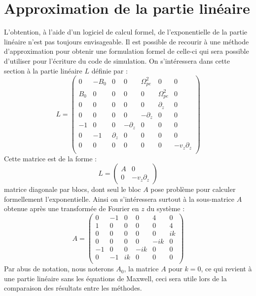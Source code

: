 
\section{Approximation de la partie linéaire}
\label{s3:approx}

L'obtention, à l'aide d'un logiciel de calcul formel, de l'exponentielle de la partie linéaire n'est pas toujours envisageable. Il est possible de recourir à une méthode d'approximation pour obtenir une formulation formel de celle-ci qui sera possible d'utiliser pour l'écriture du code de simulation. On s'intéressera dans cette section à la partie linéaire $L$ définie par :
$$
  L = \begin{pmatrix}
    0   & -B_0 & 0          &  0          &  \Omega_{pe}^2 & 0             & 0 \\
    B_0 &  0   & 0          &  0          &  0             & \Omega_{pe}^2 & 0 \\
    0   &  0   & 0          &  0          &  0             & \partial_z    & 0 \\
    0   &  0   & 0          &  0          & -\partial_z    & 0             & 0 \\
   -1   &  0   & 0          & -\partial_z &  0             & 0             & 0 \\
    0   & -1   & \partial_z &  0          &  0             & 0             & 0 \\
    0   &  0   & 0          &  0          &  0             & 0             & -v_z\partial_z \\
  \end{pmatrix}
$$
Cette matrice est de la forme :
$$
  L = \begin{pmatrix}
    A & 0 \\
    0 & -v_z\partial_z
  \end{pmatrix}
$$
matrice diagonale par blocs, dont seul le bloc $A$ pose problème pour calculer formellement l'exponentielle. Ainsi on s'intéressera surtout à la sous-matrice $A$ obtenue après une transformée de Fourier en $z$ du système :
$$
  A = \begin{pmatrix}
    0 & -1 & 0  &  0  &  4  & 0  \\
    1 &  0 & 0  &  0  &  0  & 4  \\
    0 &  0 & 0  &  0  &  0  & ik \\
    0 &  0 & 0  &  0  & -ik & 0  \\
   -1 &  0 & 0  & -ik &  0  & 0  \\
    0 & -1 & ik &  0  &  0  & 0  \\
  \end{pmatrix}
$$
Par abus de notation, nous noterons $A_0$, la matrice $A$ pour $k=0$, ce qui revient à une partie linéaire sans les équations de Maxwell, ceci sera utile lors de la comparaison des résultats entre les méthodes.

